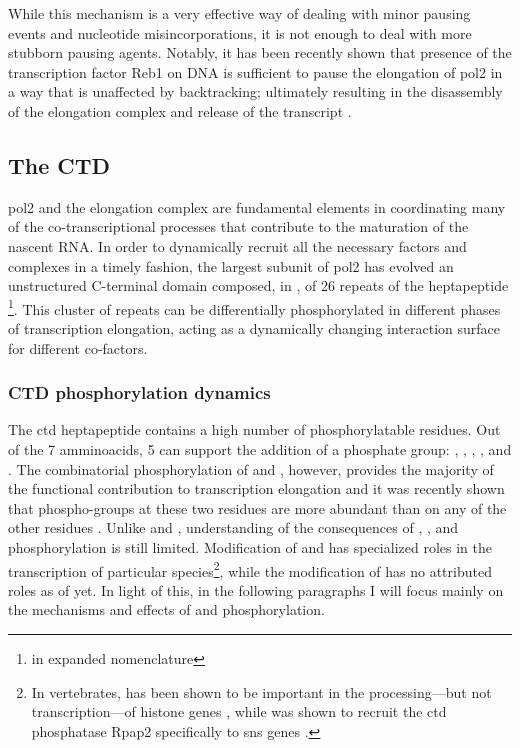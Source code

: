 While this mechanism is a very effective way of dealing with minor pausing events and nucleotide misincorporations, it is not enough to deal with more stubborn pausing agents.
Notably, it has been recently shown that presence of the transcription factor Reb1 on DNA is sufficient to pause the elongation of \gls{pol2} in a way that is unaffected by backtracking; ultimately resulting in the disassembly of the elongation complex and release of the transcript \cite{colin:2014:roadblock}.
 


\subsection{The CTD}
\gls{pol2} and the elongation complex are fundamental elements in coordinating many of the co-transcriptional processes that contribute to the maturation of the nascent RNA.
In order to dynamically recruit all the necessary factors and complexes in a timely fashion, the largest subunit of \gls{pol2} has evolved an unstructured C-terminal domain composed, in \cer, of 26 repeats of the heptapeptide \ctdshort{} \footnote{\ctdlong{} in expanded nomenclature}.
This cluster of repeats can be differentially phosphorylated in different phases of transcription elongation, acting as a dynamically changing interaction surface for different co-factors. 

\subsubsection{CTD phosphorylation dynamics} 
The \gls{ctd} heptapeptide contains a high number of phosphorylatable residues.
Out of the 7 amminoacids, 5 can support the addition of a phosphate group: \tyr{}, \sert{}, \thr{}, \serf{}, and \sers{}.
The combinatorial phosphorylation of \sert{} and \serf{}, however, provides the majority of the functional contribution to transcription elongation and it was recently shown that phospho-groups at these two residues are more abundant than on any of the other residues \citep{suh:2016:direct}. Unlike \sert{} and \serf{}, understanding of the consequences of \tyr{}, \thr{}, and \sers{} phosphorylation is still limited. 
Modification of \thr{} and \sers{} has specialized roles in the transcription of particular species\footnote{In vertebrates, \thr{} has been shown to be important in the processing---but not transcription---of histone genes \cite{hsin:2011:rnap}, while \sers{} was shown to recruit the \gls{ctd} phosphatase Rpap2 specifically to \gls{sns} genes \citep{egloff:2012:role}.}, while the modification of \tyr{} has no attributed roles as of yet. 
In light of this, in the following paragraphs I will focus mainly on the mechanisms and effects of \sert{} and \serf{} phosphorylation.

